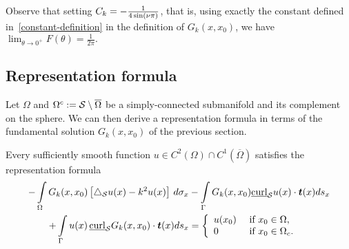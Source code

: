 Observe that setting $\C=-\frac{1}{4\sin(\nu \pi)}$, that is, using
exactly the constant defined in~\eqref{constant-definition} in the
definition of $G_k(x,x_0)$, we have $\lim_{\theta\rightarrow
0^+}F(\theta)=\frac{1}{2\pi}.$




\subsection{Representation formula}
\label{s:representation}
Let $\Omega$ and $\Omega^{c}:=\S\setminus{\overline{\Omega}}$ be a
simply-connected submanifold and its complement on the sphere. We can
then derive a representation formula in terms of the fundamental
solution
$G_k(x,x_{0})$ of the previous section.
\begin{proposition}
\label{prop:repr}
Every sufficiently smooth function $u \in C^{2}(\Omega) \cap
C^{1}(\overline{\Omega})$ satisfies the representation formula
\begin{align} 
\label{eq:representationformula}
 - \int\limits_{\Omega} 
    G_k(x,x_{0})\left[\lap_{\S}u(x) -k^2 u(x)\right]\,d\sigma_x 
 &- \int\limits_{{\Gamma}} G_k(x,x_{0})  
    \underline{\mbox{curl}}_{\S} u(x) \cdot \vec{t}(x) ds_x \nonumber \\
 + \int\limits_{{\Gamma}}  u(x)
 \,\underline{\mbox{curl}}_{{\S}} G_k(x,x_0) \cdot \vec{t}(x) ds_x 
 &= \left\{ \begin{array}{ll} u(x_0) & \mbox{ if $x_0\in \Omega$},\\
  0 & \mbox{ if  $x_0\in{\Omega}_c$}. 
  \end{array} \right.
\end{align}

\end{proposition}

